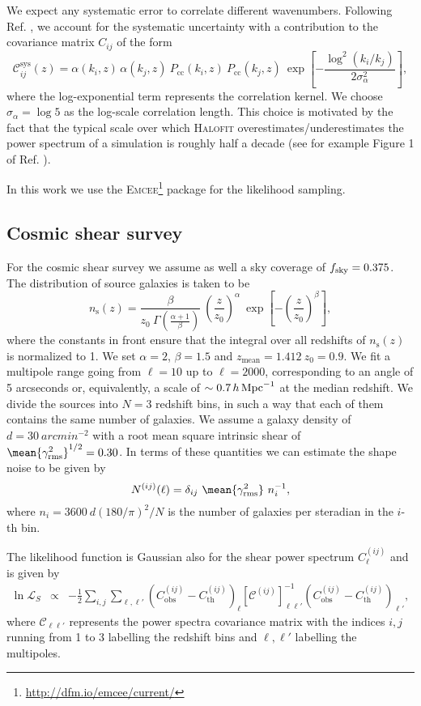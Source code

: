 \documentclass[a4paper,11pt]{article}
\newcommand{\be}{\begin{equation}}
\newcommand{\ee}{\end{equation}}
\newcommand{\bea}{\begin{eqnarray}}
\newcommand{\eea}{\end{eqnarray}}
\def\kMpc{\, h \, {\rm Mpc}^{-1}}
\begin{document}
We expect any systematic error to correlate different wavenumbers. Following Ref. \cite{Baldauf+16}, we account for the systematic uncertainty with a contribution to the covariance matrix $C_{ij}$ of the form  
\be
\mathcal{C}^\mathrm{sys}_{ij}(z) =
\alpha(k_i,z)\,  \alpha(k_j,z) \ P_\textrm{cc}(k_i,z) \ P_\textrm{cc}(k_j,z) \ 
\exp{\left[-\frac{\log^2(k_i/k_j)}{2\sigma_\alpha^2}\right]},
\label{eq:covmat_Pk}
\ee
where the log-exponential term represents the correlation kernel. We choose $\sigma_\alpha = \log 5$ as the log-scale correlation length.
This choice is motivated by the fact that the typical scale over which \textsc{Halofit} overestimates/underestimates the power spectrum of a simulation is roughly half a decade (see for example Figure 1 of Ref. \cite{Mead-b+15}).

In this work we use the \textsc{Emcee}\footnote{\url{http://dfm.io/emcee/current/}} package for the likelihood sampling.

\subsection{Cosmic shear survey}

For the cosmic shear survey we assume as well a sky coverage of $f_{\rm sky}=0.375$.
The distribution of source galaxies is taken to be
\be
n_\mathrm s(z) = \frac{\beta}{z_0 \ \Gamma\left(\frac{\alpha+1}{\beta}\right)} \ \left(\frac{z}{z_0}\right)^\alpha \ \exp{\left[-\left(\frac{z}{z_0}\right)^\beta\right]},
\ee
where the constants in front ensure that the integral over all redshifts of $n_\mathrm s(z)$ is normalized to 1.
We set $\alpha = 2$, $\beta = 1.5$ and $z_\mathrm{mean} = 1.412 \ z_0 = 0.9$.
We fit a multipole range going from $\ell=10$ up to $\ell = 2000$, corresponding to an angle of 5 arcseconds or, equivalently, a scale of $\sim 0.7 \kMpc$ at the median redshift.
We divide the sources into $N=3$ redshift bins, in such a way that each of them contains the same number of galaxies.
We assume a galaxy density of $d = 30 \ \unit{arcmin^{-2}}$ with a root mean square intrinsic shear of $\mean{\gamma_\mathrm{rms}^2}^{1/2}=0.30$.
In terms of these quantities we can estimate the shape noise to be given by
\be
N^{(ij)}(\ell) = \delta_{ij} \ \mean{\gamma_\mathrm{rms}^2} \ n_i^{-1},
\label{eq:shear_noise}
\ee
where $n_i = 3600 \ d \left(180/\pi\right)^2/N$ is the number of galaxies per steradian in the $i$-th bin.

The likelihood function is Gaussian also for the shear power spectrum $C_{\ell}^{(ij)}$ and is given by
\bea
\ln \mathcal{L}_S &\propto& -\frac{1}{2} \sum_{i,j} \sum_{\ell, \ell'}
\left(C_\mathrm{obs}^{(ij)} - C_\mathrm{th}^{(ij)} \right)_{\ell} \left[\mathcal{C}^{(ij)}\right]^{-1}_{\ell\ell'}
\left(C_\mathrm{obs}^{(ij)} - C_\mathrm{th}^{(ij)} \right)_{\ell'},
\label{eq:likelihood_Cl}
\eea
where $\mathcal{C}_{\ell\ell'}$ represents the power spectra covariance matrix with the indices $i,j$ running from 1 to 3 labelling the redshift bins and $\ell, \ell'$ labelling the multipoles.
\end{document}
